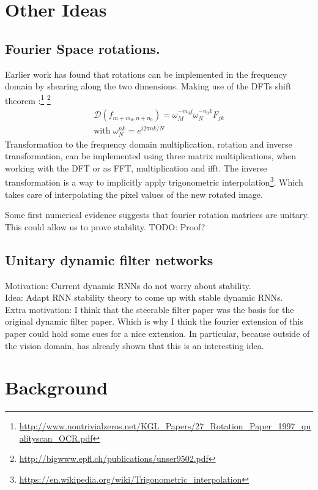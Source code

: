 \documentclass{article}
\begin{document}
\section{Other Ideas}
\subsection{Fourier Space rotations.}
Earlier work has found that rotations can be implemented in the frequency domain by shearing along 
the two dimensions. Making use of the DFTs shift theorem \cite[page 173]{Briggs}:\footnote{\url{http://www.nontrivialzeros.net/KGL_Papers/27_Rotation_Paper_1997_qualityscan_OCR.pdf}}
\footnote{\url{http://bigwww.epfl.ch/publications/unser9502.pdf}}
\begin{align}
\mathcal{D}(f_{m + m_0, n + n_0}) = \omega_M^{-m_0j}\omega_N^{-n_0k}F_{jk} \\
\text{with } \omega_N^{nk} = e^{i2\pi nk/N}
\end{align}
Transformation to the frequency domain multiplication, rotation and inverse transformation, can be implemented using three matrix multiplications, when working with the DFT or as FFT, multiplication and ifft. The inverse transformation is a way to implicitly apply trigonometric interpolation\footnote{\url{https://en.wikipedia.org/wiki/Trigonometric_interpolation}}. Which takes care of interpolating the pixel values of the new rotated image.

Some first numerical evidence suggests that fourier rotation matrices are unitary. This could allow us to prove stability. TODO: Proof?

\subsection{Unitary dynamic filter networks}
Motivation: Current dynamic RNNs do not worry about stability. \\
Idea: Adapt RNN stability theory to come up with stable dynamic RNNs. \\
Extra motivation: I think that the steerable filter paper \cite{Freeman} was the basis for the original dynamic filter paper. Which is why I think the fourier extension of this paper \cite{Michaelis} could hold some cues for a nice extension. In particular, because outside of the vision domain, \cite{Hyland} has already shown that this is an interesting idea. 

\section{Background}
\end{document}
